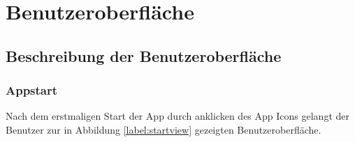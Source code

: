 
\chapter{Benutzeroberfläche}

\section{Beschreibung der Benutzeroberfläche}
\subsection{Appstart}
Nach dem erstmaligen Start der App durch anklicken des App Icons gelangt der Benutzer zur in Abbildung \ref{label:startview} gezeigten Benutzeroberfläche.

